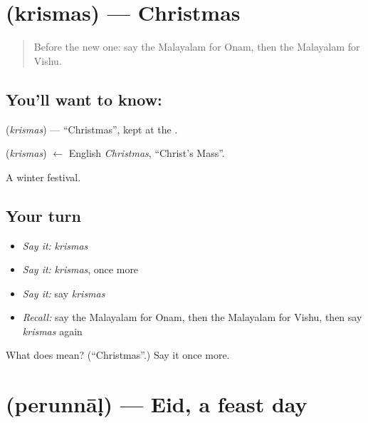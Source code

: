 \section[\texorpdfstring{\ml{ക്രിസ്മസ്} (krismas)}{ക്രിസ്മസ് (krismas)}]{ (krismas) — Christmas}

\label{lesson:ML-C141-christmas}



\begin{quote}
Before the new one: say the Malayalam for Onam, then the Malayalam for Vishu.
\end{quote}

\subsection*{You'll want to know: }
\textbf{} (\emph{krismas}) — \textquotedblleft{}Christmas\textquotedblright{}, kept at the \textbf{}.

\begin{cousinweb}
\textbf{} (\emph{krismas}) $\leftarrow$ English \emph{Christmas}, \textquotedblleft{}Christ's Mass\textquotedblright{}.
\end{cousinweb}

\begin{grammarlens}[title={What you've built}]
A winter festival.
\end{grammarlens}

\subsection*{Your turn}
\begin{itemize}
\raggedright
  \item \emph{Say it:} \emph{krismas}
  \item \emph{Say it:} \emph{krismas}, once more
  \item \emph{Say it:} say \emph{krismas}
  \item \emph{Recall:} say the Malayalam for Onam, then the Malayalam for Vishu, then say \emph{krismas} again
\end{itemize}

\begin{tcolorbox}[breakable,colback=teal!4,colframe=teal!35!black,title={Before you move on}]
What does  mean? (\textquotedblleft{}Christmas\textquotedblright{}.) Say it once more.
\end{tcolorbox}
\section[\texorpdfstring{\ml{പെരുന്നാൾ} (perunnāḷ)}{പെരുന്നാൾ (perunnāḷ)}]{ (perunnāḷ) — Eid, a feast day}


